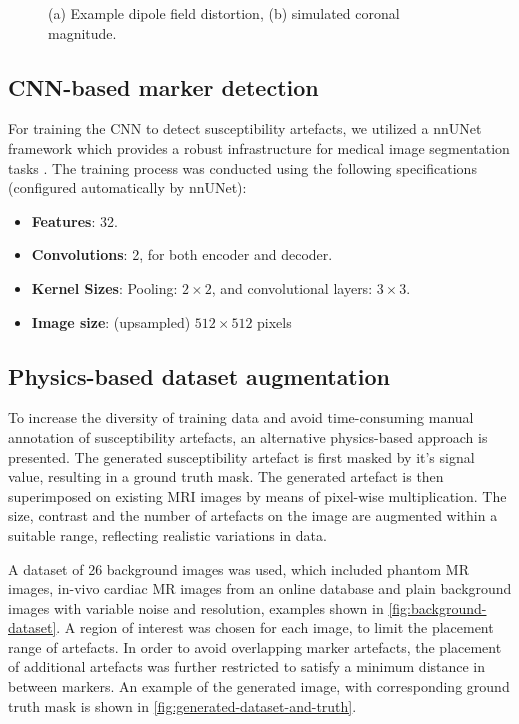 \documentclass[conference]{IEEEtran}
\begin{document}
\begin{figure}[h]
\begin{minipage}{0.241\textwidth}
    \end{minipage}\hfill \hspace*{0cm}
    \caption{(a) Example dipole field distortion,
    (b) simulated coronal magnitude.}
    \label{fig:simulations}
\end{figure}

\subsection{CNN-based marker detection}\label{training-cnn}

For training the CNN to detect susceptibility artefacts, we utilized a nnUNet framework which provides a robust infrastructure for medical image segmentation tasks \cite{pmid33288961}. The training process was conducted using the following specifications (configured automatically by nnUNet):
\begin{itemize}
    \item \textbf{Features}: 32.
    \item \textbf{Convolutions}: 2, for both encoder and decoder.
    \item \textbf{Kernel Sizes}: Pooling: $2 \times 2$, and convolutional layers: $3 \times 3$.
    \item \textbf{Image size}: (upsampled) $512 \times 512$ pixels
\end{itemize}

\subsection{Physics-based dataset augmentation}\label{artefact-cnn-dataset}

To increase the diversity of training data and avoid time-consuming manual annotation of susceptibility artefacts, an alternative physics-based approach is presented. The generated susceptibility artefact is first masked by it's signal value, resulting in a ground truth mask. The generated artefact is then superimposed on existing MRI images by means of pixel-wise multiplication. The size, contrast and the number of artefacts on the image are augmented within a suitable range, reflecting realistic variations in data.

A dataset of 26 background images was used, which included phantom MR images, in-vivo cardiac MR images from an online database \cite{pmid29994302} and plain background images with variable noise and resolution, examples shown in \autoref{fig:background-dataset}. A region of interest was chosen for each image, to limit the placement range of artefacts. In order to avoid overlapping marker artefacts, the placement of additional artefacts was further restricted to satisfy a minimum distance in between markers. An example of the generated image, with corresponding ground truth mask is shown in \autoref{fig:generated-dataset-and-truth}.
\end{document}
